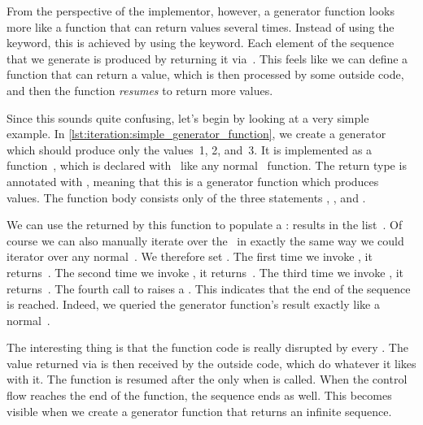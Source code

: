 From the perspective of the implementor, however, a generator function looks more like a function that can return values several times.
Instead of using the  keyword, this is achieved by using the  keyword.
Each element of the sequence that we generate is produced by returning it via~.
This feels like we can define a function that can return a value, which is then processed by some outside code, and then the function \emph{resumes} to return more values.

Since this sounds quite confusing, let's begin by looking at a very simple example.
In \cref{lst:iteration:simple_generator_function}, we create a generator which should produce only the values~1, 2, and~3.
It is implemented as a function~, which is declared with~ like any normal \python\ function.
The return type is annotated with  , meaning that this is a generator function which produces~ values.
The function body consists only of the three statements , , and .

We can use the  returned by this function to populate a :
 results in the list~\pythonil{[1, 2, 3]}.
Of course we can also manually iterate over the~ in exactly the same way we could iterator over any normal~.
We therefore set .
The first time we invoke , it returns~.
The second time we invoke , it returns~.
The third time we invoke , it returns~.
The fourth call to  raises a .
This indicates that the end of the sequence is reached.
Indeed, we queried the generator function's result exactly like a normal~.

The interesting thing is that the function code is really disrupted by every .
The value returned via  is then received by the outside code, which do whatever it likes with it.
The function is resumed after the  only when  is called.
When the control flow reaches the end of the function, the sequence ends as well.
This becomes visible when we create a generator function that returns an infinite sequence.

